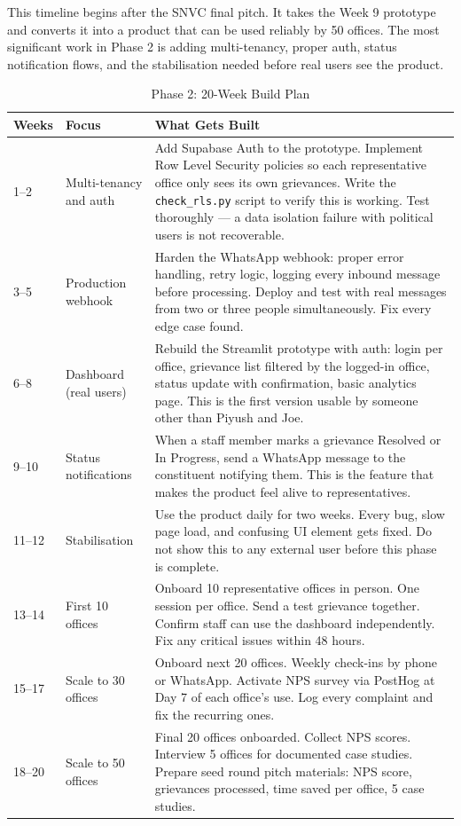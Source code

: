 \documentclass[12pt, a4paper]{article}
\begin{document}
This timeline begins after the SNVC final pitch. It takes the Week 9 prototype
and converts it into a product that can be used reliably by 50 offices.
The most significant work in Phase 2 is adding multi-tenancy, proper auth,
status notification flows, and the stabilisation needed before real users
see the product.

\begin{table}[ht]
\centering
\caption{Phase 2: 20-Week Build Plan}
\renewcommand{\arraystretch}{1.8}
\begin{tabularx}{\textwidth}{p{2cm} p{3cm} X}
\toprule
\rowcolor{pollitylightblue}
\textbf{Weeks} & \textbf{Focus} & \textbf{What Gets Built} \\
\midrule
1--2  & Multi-tenancy and auth & Add Supabase Auth to the prototype. Implement Row Level Security policies so each representative office only sees its own grievances. Write the \texttt{check\_rls.py} script to verify this is working. Test thoroughly --- a data isolation failure with political users is not recoverable. \\
\midrule
3--5  & Production webhook      & Harden the WhatsApp webhook: proper error handling, retry logic, logging every inbound message before processing. Deploy and test with real messages from two or three people simultaneously. Fix every edge case found. \\
\midrule
6--8  & Dashboard (real users)  & Rebuild the Streamlit prototype with auth: login per office, grievance list filtered by the logged-in office, status update with confirmation, basic analytics page. This is the first version usable by someone other than Piyush and Joe. \\
\midrule
9--10 & Status notifications    & When a staff member marks a grievance Resolved or In Progress, send a WhatsApp message to the constituent notifying them. This is the feature that makes the product feel alive to representatives. \\
\midrule
11--12 & Stabilisation          & Use the product daily for two weeks. Every bug, slow page load, and confusing UI element gets fixed. Do not show this to any external user before this phase is complete. \\
\midrule
13--14 & First 10 offices       & Onboard 10 representative offices in person. One session per office. Send a test grievance together. Confirm staff can use the dashboard independently. Fix any critical issues within 48 hours. \\
\midrule
15--17 & Scale to 30 offices    & Onboard next 20 offices. Weekly check-ins by phone or WhatsApp. Activate NPS survey via PostHog at Day 7 of each office's use. Log every complaint and fix the recurring ones. \\
\midrule
18--20 & Scale to 50 offices    & Final 20 offices onboarded. Collect NPS scores. Interview 5 offices for documented case studies. Prepare seed round pitch materials: NPS score, grievances processed, time saved per office, 5 case studies. \\
\bottomrule
\end{tabularx}
\end{table}
\end{document}
